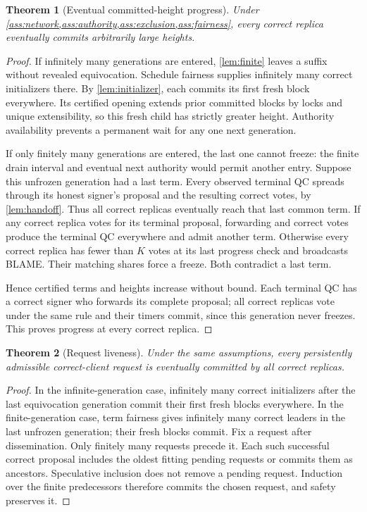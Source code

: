 \documentclass[11pt,a4paper]{article}
\newtheorem{theorem}[theorem]{Theorem}
\begin{document}
\begin{theorem}[Eventual committed-height progress]
\label{thm:height}
Under \cref{ass:network,ass:authority,ass:exclusion,ass:fairness}, every
correct replica eventually commits arbitrarily large heights.
\end{theorem}
\begin{proof}
If infinitely many generations are entered, \cref{lem:finite} leaves a
suffix without revealed equivocation. Schedule fairness supplies infinitely
many correct initializers there. By \cref{lem:initializer}, each commits
its first fresh block everywhere. Its certified opening extends prior
committed blocks by locks and unique extensibility, so this fresh child
has strictly greater height. Authority availability prevents a permanent
wait for any one next generation.

If only finitely many generations are entered, the last one cannot freeze:
the finite drain interval and eventual next authority would permit another
entry. Suppose this unfrozen generation had a last term. Every observed
terminal QC spreads through its honest signer's proposal and the resulting
correct votes, by \cref{lem:handoff}. Thus all correct replicas eventually
reach that last common term. If any correct replica votes for its terminal
proposal, forwarding and correct votes produce the terminal QC everywhere
and admit another term. Otherwise every correct replica has fewer than
$K$ votes at its last progress check and broadcasts BLAME. Their matching
shares force a freeze. Both contradict a last term.

Hence certified terms and heights increase without bound. Each terminal
QC has a correct signer who forwards its complete proposal; all correct
replicas vote under the same rule and their timers commit, since this
generation never freezes. This proves progress at every correct replica.
\end{proof}

\begin{theorem}[Request liveness]
\label{thm:requests}
Under the same assumptions, every persistently admissible correct-client
request is eventually committed by all correct replicas.
\end{theorem}
\begin{proof}
In the infinite-generation case, infinitely many correct initializers
after the last equivocation generation commit their first fresh blocks
everywhere. In the finite-generation case, term fairness gives infinitely
many correct leaders in the last unfrozen generation; their fresh blocks
commit. Fix a request after dissemination. Only finitely many requests
precede it. Each such successful correct proposal includes the oldest
fitting pending requests or commits them as ancestors. Speculative
inclusion does not remove a pending request. Induction over the finite
predecessors therefore commits the chosen request, and safety preserves it.
\end{proof}
\end{document}
